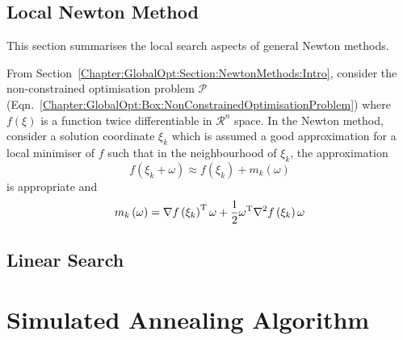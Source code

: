 \subsection{Local Newton Method}\label{Chapter:GlobalOpt:Section:NewtonMethods:LocalNewton}
This section summarises the local search aspects of general Newton methods.

From Section~\ref{Chapter:GlobalOpt:Section:NewtonMethods:Intro}, consider the non-constrained optimisation problem $\mathcal{P}$ (Eqn.~\ref{Chapter:GlobalOpt:Box:NonConstrainedOptimisationProblem}) where $f\left(\xi\right)$ is a function twice differentiable in $\mathcal{R}^{n}$ space. In the Newton method, consider a solution coordinate $\xi_{k}$ which is assumed a good approximation for a local minimiser of $f$ such that in the neighbourhood of $\xi_{k}$, the approximation
\begin{displaymath}
    f\left(\xi_{k}+\omega\right) \approx f\left(\xi_{k}\right) + m_{k}\left(\omega\right)
\end{displaymath}
is appropriate and 
\begin{displaymath}
m_{k}\left(\omega\right) = \nabla f\left(\xi_{k}\right)^{\text{T}}\omega + \displaystyle\frac{1}{2}\omega^{\text{T}}\nabla^{2}f\left(\xi_{k}\right)\omega
\end{displaymath}




\subsection{Linear Search}\label{Chapter:GlobalOpt:Section:NewtonMethods:LinearSearch}


\clearpage
\section{Simulated Annealing Algorithm}\label{Chapter:GlobalOpt:Section:SimulatedAnnealing}

